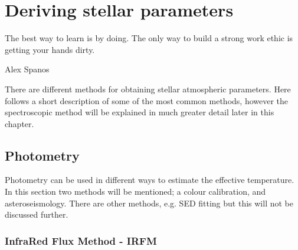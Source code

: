 
\chapter{Deriving stellar parameters}
\label{cha:method}
\epigraph{The best way to learn is by doing. The only way to build a strong work ethic is getting
          your hands dirty.}{Alex Spanos}

There are different methods for obtaining stellar atmospheric parameters. Here follows a short
description of some of the most common methods, however the spectroscopic method will be explained
in much greater detail later in this chapter.


\section{Photometry}

Photometry can be used in different ways to estimate the effective temperature. In this section two
methods will be mentioned; a colour calibration, and asteroseismology. There are other methods, e.g.
SED fitting but this will not be discussed further.

\subsection{InfraRed Flux Method - IRFM}
\label{sec:irfm}


